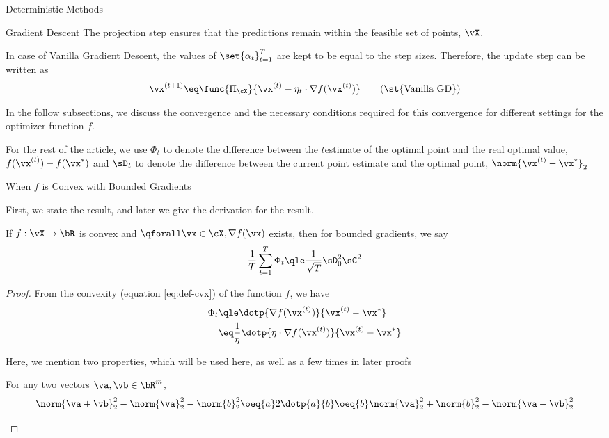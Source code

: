 \documentclass{article}
\newcommand{\f}[1]{f(\vx^{(#1)})}
\newcommand{\fs}{f(\vx^\ast)}
\newcommand{\gf}[1]{\nabla f(\vx^{(#1)})}
\newcommand{\ggf}{\nabla f(\vx)}
\newcommand{\x}[1]{\vx^{(#1)}}
\newcommand{\xs}{\vx^{\ast}}
\newcommand{\fpi}[2]{\func{\Pi_{#1}}{#2}}
\begin{document}
\begin{psection}{Deterministic Methods}
\begin{psubsection}{Gradient Descent}
		The projection step ensures that the predictions remain within the feasible set of points, \ie $\vX$.

		In case of Vanilla Gradient Descent, the values of $\set{\alpha_t}_{t = 1}^T$ are kept to be equal to the step sizes. Therefore, the update step can be written as
		\begin{align}
			\x{t+1}	\eq	\fpi{\cX}{\x{t} - \eta_t \cdot \gf{t}}
			\tag{\st{Vanilla GD}}
			\label{eq:vgd}
		\end{align}

		In the follow subsections, we discuss the convergence and the necessary conditions required for this convergence for different settings for the optimizer function $f$.

		\begin{note}
			For the rest of the article, we use $\Phi_t$ to denote the difference between the $t$\tth estimate of the optimal point and the real optimal value, \ie $\f{t} - \fs$ and $\sD_t$ to denote the difference between the current point estimate and the optimal point, \ie $\norm{\x{t} - \xs}_2$
		\end{note}

		\begin{pssubsection}{When $f$ is Convex with Bounded Gradients}

			First, we state the result, and later we give the derivation for the result.

			\begin{theorem}
				If $f : \vX \to \bR$ is convex and $\qforall \vx \in \cX, \ggf$ exists, then for bounded gradients, we say
				\begin{align}
					\frac{1}{T} \sum_{t = 1}^T \Phi_t	\qle	\frac{1}{\sqrt{T}} \sD_0^2 \sG^2
					\label{eq:gd-cvx-bddg}
				\end{align}
				\label{th:gd-cvx-bddg}

				\begin{proof}
					From the convexity (equation \ref{eq:def-cvx}) of the function $f$, we have
					\begin{align*}
						\Phi_t	&\qle	\dotp{\gf{t}}{\x{t} - \xs} \\
								&\eq	\frac{1}{\eta} \dotp{\eta \cdot \gf{t}}{\x{t} - \xs}
					\end{align*}

					Here, we mention two properties, which will be used here, as well as a few times in later proofs

					\begin{property}
						For any two vectors $\va, \vb \in \bR^m$,
						\begin{equation}
							\norm{\va + \vb}_2^2 - \norm{\va}_2^2 - \norm{b}_2^2	\oeq{a}	2\dotp{a}{b}	\oeq{b}	\norm{\va}_2^2 + \norm{b}_2^2 - \norm{\va - \vb}_2^2
							\label{eq:dotp}
						\end{equation}
					\end{property}


\end{proof}
\end{theorem}
\end{pssubsection}
\end{psubsection}
\end{psection}
\end{document}
